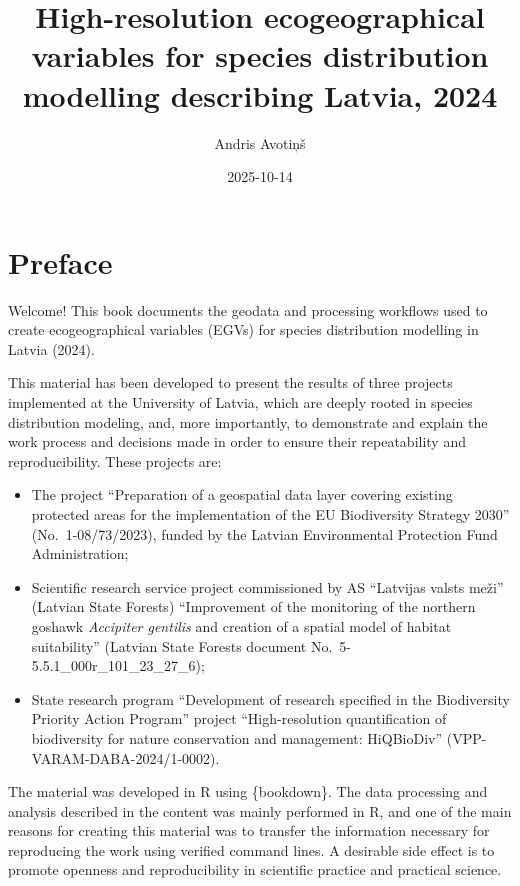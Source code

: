 \documentclass[
]{book}
\title{High-resolution ecogeographical variables for species distribution modelling describing Latvia, 2024}
\author{Andris Avotiņš}
\date{2025-10-14}
\begin{document}
\maketitle

{
\setcounter{tocdepth}{1}
\tableofcontents
}
\chapter*{Preface}\label{preface}

Welcome! This book documents the geodata and processing workflows used to create
ecogeographical variables (EGVs) for species distribution modelling in Latvia (2024).

This material has been developed to present the results of three projects
implemented at the University of Latvia, which are deeply rooted in species
distribution modeling, and, more importantly, to demonstrate and explain the
work process and decisions made in order to ensure their repeatability and
reproducibility. These projects are:

\begin{itemize}
\item
  The project ``Preparation of a geospatial data layer covering existing
  protected areas for the implementation of the EU Biodiversity Strategy
  2030'' (No.~1-08/73/2023), funded by the Latvian Environmental Protection Fund
  Administration;
\item
  Scientific research service project commissioned by AS ``Latvijas valsts
  meži'' (Latvian State Forests) ``Improvement of the monitoring of the northern
  goshawk \emph{Accipiter gentilis} and creation of a spatial model of habitat
  suitability'' (Latvian State Forests document No.~5-5.5.1\_000r\_101\_23\_27\_6);
\item
  State research program ``Development of research specified in the Biodiversity
  Priority Action Program'' project ``High-resolution quantification of biodiversity
  for nature conservation and management: HiQBioDiv'' (VPP-VARAM-DABA-2024/1-0002).
\end{itemize}

The material was developed in R using \{bookdown\}. The data processing and analysis
described in the content was mainly performed in R, and one of the main reasons
for creating this material was to transfer the information necessary for
reproducing the work using verified command lines. A desirable side effect
is to promote openness and reproducibility in scientific practice and practical
science.
\end{document}
